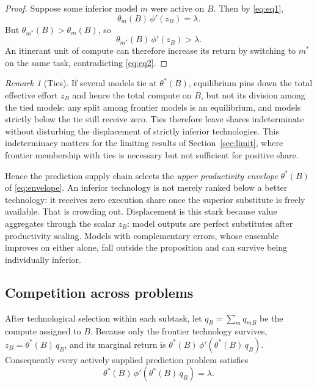 \documentclass[11pt]{article}
\theoremstyle{definition}
\theoremstyle{remark}
\newtheorem{remark}{Remark}
\begin{document}
\begin{proof}
Suppose some inferior model $m$ were active on $B$. Then by \eqref{eq:eq1},
\begin{equation}
\theta_m(B)\, \phi'(z_B) = \lambda.
\end{equation}
But $\theta_{m^*}(B) > \theta_m(B)$, so
\begin{equation}
\theta_{m^*}(B)\, \phi'(z_B) > \lambda.
\end{equation}
An itinerant unit of compute can therefore increase its return by switching to $m^*$ on the same task, contradicting \eqref{eq:eq2}.
\end{proof}

\begin{remark}[Ties]
\label{rem:ties}
If several models tie at $\theta^*(B)$, equilibrium pins down the total effective effort $z_B$ and hence the total compute on $B$, but not its division among the tied models: any split among frontier models is an equilibrium, and models strictly below the tie still receive zero. Ties therefore leave shares indeterminate without disturbing the displacement of strictly inferior technologies. This indeterminacy matters for the limiting results of Section~\ref{sec:limit}, where frontier membership with ties is necessary but not sufficient for positive share.
\end{remark}

Hence the prediction supply chain selects the \emph{upper productivity envelope} $\theta^*(B)$ of \eqref{eq:envelope}. An inferior technology is not merely ranked below a better technology: it receives zero execution share once the superior substitute is freely available. That is crowding out. Displacement is this stark because value aggregates through the scalar $z_B$: model outputs are perfect substitutes after productivity scaling. Models with complementary errors, whose ensemble improves on either alone, fall outside the proposition and can survive being individually inferior.

\subsection{Competition across problems}

After technological selection within each subtask, let $q_B = \sum_m q_{mB}$ be the compute assigned to $B$. Because only the frontier technology survives, $z_B = \theta^*(B)\, q_B$, and its marginal return is $\theta^*(B)\, \phi'\!\left(\theta^*(B)\, q_B\right)$. Consequently every actively supplied prediction problem satisfies
\begin{equation}
\label{eq:cross}
\theta^*(B)\, \phi'\!\left( \theta^*(B)\, q_B \right) = \lambda.
\end{equation}
\end{document}
